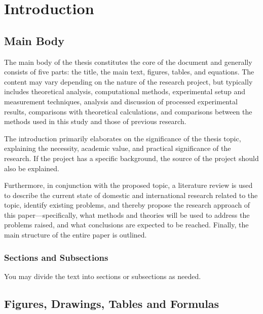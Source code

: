 \chapter{Introduction\label{chap:introduction}}

\section{Main Body}

The main body of the thesis constitutes the core of the document and generally consists of five parts: the title, the main text, figures, tables, and equations. The content may vary depending on the nature of the research project, but typically includes theoretical analysis, computational methods, experimental setup and measurement techniques, analysis and discussion of processed experimental results, comparisons with theoretical calculations, and comparisons between the methods used in this study and those of previous research.

The introduction primarily elaborates on the significance of the thesis topic, explaining the necessity, academic value, and practical significance of the research. If the project has a specific background, the source of the project should also be explained.

Furthermore, in conjunction with the proposed topic, a literature review is used to describe the current state of domestic and international research related to the topic, identify existing problems, and thereby propose the research approach of this paper—specifically, what methods and theories will be used to address the problems raised, and what conclusions are expected to be reached. Finally, the main structure of the entire paper is outlined.

\subsection{Sections and Subsections}

You may divide the text into sections or subsections as needed.

\section{Figures, Drawings, Tables and Formulas}

